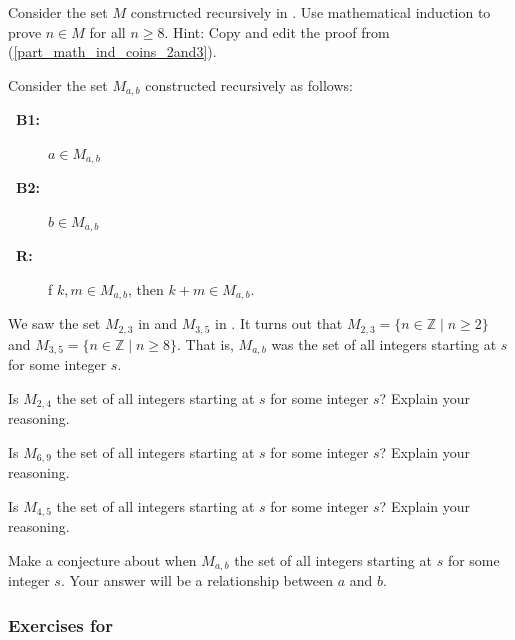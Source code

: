 \begin{exer}[\exerE] %
\label{exer_coins_3and5_math_ind}
    Consider the set $M$ constructed recursively in .  Use mathematical induction to prove $n \in M$ for all $n \ge 8$.  Hint: Copy and edit the proof from  (\ref{part_math_ind_coins_2and3}). 
\end{exer}

\begin{exer}[\exerE] %
\label{exer_aandb_set}
    Consider the set $M_{a,b}$ constructed recursively as follows: 
        \begin{description}
            \item [\textbf{~\quad B1:}] $a \in M_{a,b}$
            \item [\textbf{~\quad B2:}] $b \in M_{a,b}$
            \item [\textbf{~\quad R:}] f $k,m \in M_{a,b}$, then $k+m \in M_{a,b}$.
        \end{description}
    We saw the set $M_{2,3}$ in  and $M_{3,5}$ in .  It turns out that $M_{2,3} = \{ n \in \mathbb{Z} \mid n \ge 2\}$ and $M_{3,5}= \{ n \in \mathbb{Z} \mid n \ge 8\}$.  That is, $M_{a,b}$ was the set of all integers starting at $s$ for some integer $s$.
    \begin{exerpart}
        \item Is $M_{2,4}$ the set of all integers starting at $s$ for some integer $s$?  Explain your reasoning.
        \item Is $M_{6,9}$ the set of all integers starting at $s$ for some integer $s$?  Explain your reasoning. 
        \item Is $M_{4,5}$ the set of all integers starting at $s$ for some integer $s$?  Explain your reasoning. 
        \item Make a conjecture about when $M_{a,b}$ the set of all integers starting at $s$ for some integer $s$.  Your answer will be a relationship between $a$ and $b$.
    \end{exerpart}
\end{exer}


\subsubsection*{Exercises for  \subrecgraphs}


